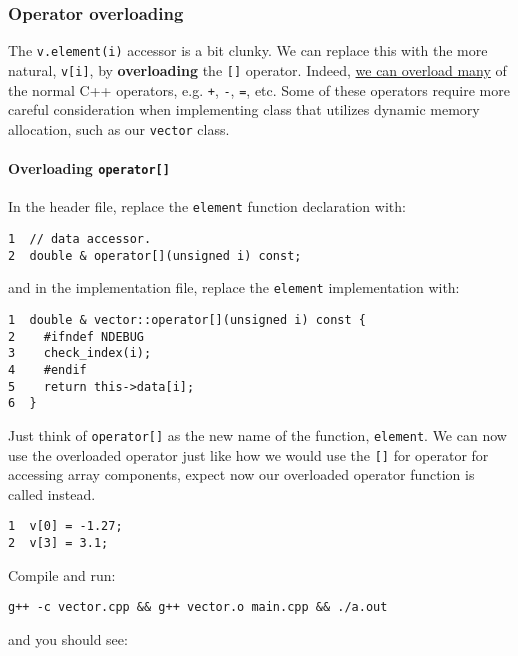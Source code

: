 \documentclass[11pt]{article}
\begin{document}
\subsubsection{Operator overloading}
\label{sec:orgheadline54}

The \texttt{v.element(i)} accessor is a bit clunky. We can replace this with the 
more natural, \texttt{v[i]}, by \textbf{overloading} the \texttt{[]} operator. Indeed,
 \href{http://en.cppreference.com/w/cpp/language/operators}{we can overload many} of the normal C++ operators, e.g. \texttt{+}, \texttt{-}, \texttt{=}, etc.
Some of these operators require more careful consideration when implementing 
class that utilizes dynamic memory allocation, such as our \texttt{vector} class.

\paragraph{Overloading \texttt{operator[]}}
\label{sec:orgheadline52}

In the header file, replace the \texttt{element} function declaration with:

\begin{verbatim}
1  // data accessor.
2  double & operator[](unsigned i) const;
\end{verbatim}

and in the implementation file, replace the \texttt{element} implementation with:

\begin{verbatim}
1  double & vector::operator[](unsigned i) const {
2    #ifndef NDEBUG
3    check_index(i);
4    #endif
5    return this->data[i];
6  }
\end{verbatim}

Just think of \texttt{operator[]} as the new name of the function, \texttt{element}. We 
can now use the overloaded operator just like how we would use the \texttt{[]} for 
operator for accessing array components, expect now our overloaded operator 
function is called instead.

\begin{verbatim}
1  v[0] = -1.27;
2  v[3] = 3.1;
\end{verbatim}

Compile and run:

\begin{verbatim}
g++ -c vector.cpp && g++ vector.o main.cpp && ./a.out
\end{verbatim}

and you should see:
\end{document}
